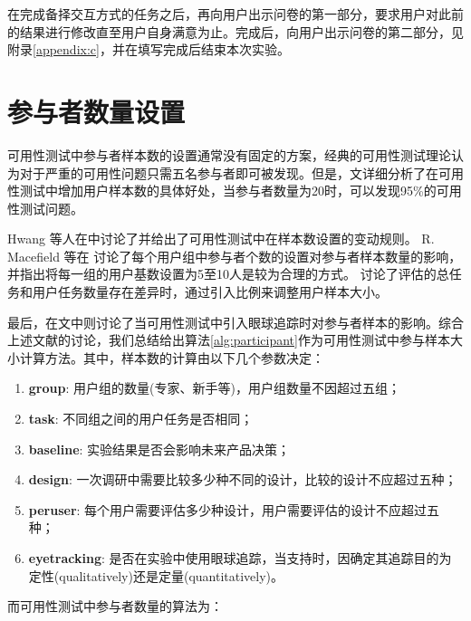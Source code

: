 在完成备择交互方式的任务之后，再向用户出示问卷的第一部分，要求用户对此前的结果进行修改直至用户自身满意为止。完成后，向用户出示问卷的第二部分，见附录\ref{appendix:c}，并在填写完成后结束本次实验。

\section{参与者数量设置}

可用性测试中参与者样本数的设置通常没有固定的方案，经典的可用性测试理论认为对于严重的可用性问题只需五名参与者即可被发现\cite{albert2013measuring}。但是，文\cite{faulkerner}详细分析了在可用性测试中增加用户样本数的具体好处，当参与者数量为20时，可以发现95\%的可用性测试问题。

Hwang 等人在\cite{Hwang:2010:NPR:1735223.1735255}中讨论了并给出了可用性测试中在样本数设置的变动规则。
R. Macefield 等在 \cite{Macefield:2009:SPG:2835425.2835429}讨论了每个用户组中参与者个数的设置对参与者样本数量的影响，并指出将每一组的用户基数设置为5至10人是较为合理的方式。
\cite{medlock2002using} 讨论了评估的总任务和用户任务数量存在差异时，通过引入比例来调整用户样本大小。

最后，在文\cite{pernice2009eyetracking}中则讨论了当可用性测试中引入眼球追踪时对参与者样本的影响。综合上述文献的讨论，我们总结给出算法\ref{alg:participant}作为可用性测试中参与样本大小计算方法。其中，样本数的计算由以下几个参数决定：
\begin{enumerate}
    \kaishu
    \item \textbf{group}: 用户组的数量(专家、新手等)，用户组数量不因超过五组；
    \item \textbf{task}: 不同组之间的用户任务是否相同；
    \item \textbf{baseline}: 实验结果是否会影响未来产品决策；
    \item \textbf{design}: 一次调研中需要比较多少种不同的设计，比较的设计不应超过五种；
    \item \textbf{peruser}: 每个用户需要评估多少种设计，用户需要评估的设计不应超过五种；
    \item \textbf{eyetracking}: 是否在实验中使用眼球追踪，当支持时，因确定其追踪目的为定性(qualitatively)还是定量(quantitatively)。
\end{enumerate}

而可用性测试中参与者数量的算法为：

